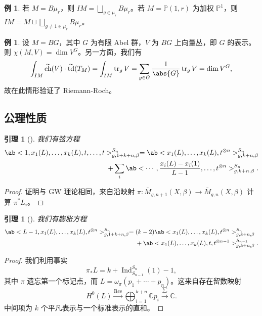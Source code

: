 \documentclass{amsart}
\newtheorem{lem}[thm]{引理}
\theoremstyle{definition}
\newtheorem{exm}[thm]{例}
\theoremstyle{remark}
\theoremstyle{plain}
\theoremstyle{definition}
\theoremstyle{remark}
\newcommand{\C}{\mathbb{C}}
\renewcommand{\P}{\mathbb{P}}
\newcommand{\on}[1]{\operatorname{#1}}
\newcommand{\wt}[1]{\widetilde{#1}}
\newcommand{\1}{\mathbf{1}}
\newcommand{\2}{\mathbf{2}}
\newcommand{\3}{\mathbf{3}}
\begin{document}
\begin{exm}
    若 \(M = B\mu_r\)，则 \(IM = \bigsqcup_{g \in \mu_r} B \mu_r\)。若 \(M = \P(1, r)\) 为加权 \(\P^1\)，则 \(IM = M \sqcup \bigsqcup_{g \neq 1 \in \mu_r} B\mu_r\)。
\end{exm}

\begin{exm}
    设 \(M = BG\)，其中 \(G\) 为有限 Abel 群，\(V\) 为 \(BG\) 上向量丛，即 \(G\) 的表示。则 \(\chi(M, V) = \dim V^G\)。另一方面，我们有
    \[ \int_{IM} \wt{\on{ch}}(V) \cdot \wt{\on{td}}(T_M) = \int_{IM} \on{tr}_g V = \sum_{g \in G} \frac{1}{\abs{G}} \on{tr}_g V = \dim V^G, \]
    故在此情形验证了 Riemann-Roch。
\end{exm}

\subsection{公理性质}%
\label{sub:Axiomatic properties}

\begin{lem}[{\cite{GiventalK7}}]
    我们有\textit{弦方程}
    \begin{align*}
        \ab< 1, x_1(L), \ldots, x_k(L), t, \ldots, t >_{g, 1+k+n, \beta}^{S_n} = \ab<x_1(L), \ldots, x_k(L), t^{\otimes n}>^{S_n}_{g,k+n,\beta} \\
        + \sum_i \ab< \cdots, \frac{x_i(L) - x_i(1)}{L-1}, \ldots, t^{\otimes n}>^{S_n}_{g,k+n,\beta}.
    \end{align*}
\end{lem}

\begin{proof}
    证明与 GW 理论相同，来自沿映射 \(\pi \colon\bar{M}_{g,n+1}(X,\beta) \to \bar{M}_{g,n}(X,\beta)\) 计算 \(\pi^* L_i\)。
\end{proof}

\begin{lem}[{\cite{GiventalK7}}]
    我们有\textit{膨胀方程}
    \begin{align*}
        \ab<L-1, x_1(L), \ldots, x_k(L), t^{\otimes n}>_{g,1+k+n,\beta}^{S_n} ={}& (k-2)\ab<x_1(L), \ldots, x_k(L), t^{\otimes n}>_{g,k+n,\beta}^{S_n} \\
        &+ \ab<x_1(L), \ldots, x_k(L), t, t^{\otimes n-1}>_{g,k+n,\beta}^{S_{n-1}}.
    \end{align*}
\end{lem}

\begin{proof}
    我们利用事实
    \[ \pi_* L = k + \on{Ind}_{S_{n-1}}^{S_n}(1) - 1, \]
    其中 \(\pi\) 遗忘第一个标记点，而 \(L = \omega_{\pi} (p_1 + \cdots + p_n)\)。这来自存在留数映射
    \[ H^0(L) \xrightarrow{\on{Res}} \bigoplus_{i=1}^{k+n} \C p_i \xrightarrow{\sum} \C. \]
    中间项为 \(k\) 个平凡表示与一个标准表示的直和。
\end{proof}
\end{document}
